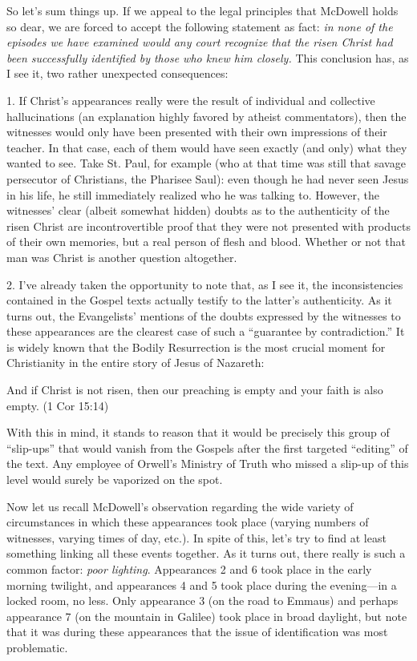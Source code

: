 So let's sum things up. If we appeal to the legal principles that McDowell holds so dear, we are forced to accept the following statement as fact: \emph{in none of the episodes we have examined would any court recognize that the risen Christ had been successfully identified by those who knew him closely.} This conclusion has, as I see it, two rather unexpected consequences:

1. If Christ's appearances really were the result of individual and collective hallucinations (an explanation highly favored by atheist commentators), then the witnesses would only have been presented with their own impressions of their teacher. In that case, each of them would have seen exactly (and only) what they wanted to see. Take St. Paul, for example (who at that time was still that savage persecutor of Christians, the Pharisee Saul): even though he had never seen Jesus in his life, he still immediately realized who he was talking to. However, the witnesses' clear (albeit somewhat hidden) doubts as to the authenticity of the risen Christ are incontrovertible proof that they were not presented with products of their own memories, but a real person of flesh and blood. Whether or not that man was Christ is another question altogether.

2. I've already taken the opportunity to note that, as I see it, the inconsistencies contained in the Gospel texts actually testify to the latter's authenticity. As it turns out, the Evangelists' mentions of the doubts expressed by the witnesses to these appearances are the clearest case of such a ``guarantee by contradiction.'' It is widely known that the Bodily Resurrection is the most crucial moment for Christianity in the entire story of Jesus of Nazareth:

\begin{smallquote}
    And if Christ is not risen, then our preaching is empty and your faith is also empty. (1 Cor 15:14)
\end{smallquote}
With this in mind, it stands to reason that it would be precisely this group of ``slip-ups'' that would vanish from the Gospels after the first targeted ``editing'' of the text. Any employee of Orwell's Ministry of Truth who missed a slip-up of this level would surely be vaporized on the spot.

Now let us recall McDowell's observation regarding the wide variety of circumstances in which these appearances took place (varying numbers of witnesses, varying times of day, etc.). In spite of this, let's try to find at least something linking all these events together. As it turns out, there really is such a common factor: \emph{poor lighting}. Appearances 2 and 6 took place in the early morning twilight, and appearances 4 and 5 took place during the evening---in a locked room, no less. Only appearance 3 (on the road to Emmaus) and perhaps appearance 7 (on the mountain in Galilee) took place in broad daylight, but note that it was during these appearances that the issue of identification was most problematic.

